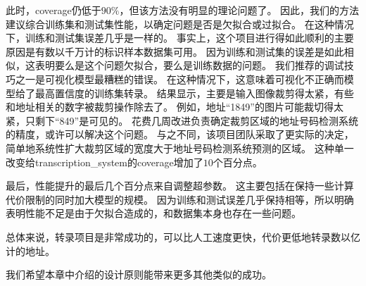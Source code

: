 此时，\gls{coverage}仍低于$90\%$，但该方法没有明显的理论问题了。
因此，我们的方法建议综合训练集和测试集性能，以确定问题是否是欠拟合或过拟合。
在这种情况下，训练和测试集误差几乎是一样的。
事实上，这个项目进行得如此顺利的主要原因是有数以千万计的标识样本数据集可用。
因为训练和测试集的误差是如此相似，这表明要么是这个问题欠拟合，要么是训练数据的问题。
我们推荐的调试技巧之一是可视化模型最糟糕的错误。
在这种情况下，这意味着可视化不正确而模型给了最高置信度的训练集转录。
结果显示，主要是输入图像裁剪得太紧，有些和地址相关的数字被裁剪操作除去了。
例如，地址“1849”的图片可能裁切得太紧，只剩下“849”是可见的。
花费几周改进负责确定裁剪区域的地址号码检测系统的精度，或许可以解决这个问题。
与之不同，该项目团队采取了更实际的决定，简单地系统性扩大裁剪区域的宽度大于地址号码检测系统预测的区域。
这种单一改变给\gls{transcription_system}的\gls{coverage}增加了$10$个百分点。


最后，性能提升的最后几个百分点来自调整超参数。
这主要包括在保持一些计算代价限制的同时加大模型的规模。
因为训练和测试误差几乎保持相等，所以明确表明性能不足是由于欠拟合造成的，和数据集本身也存在一些问题。


总体来说，转录项目是非常成功的，可以比人工速度更快，代价更低地转录数以亿计的地址。

我们希望本章中介绍的设计原则能带来更多其他类似的成功。

